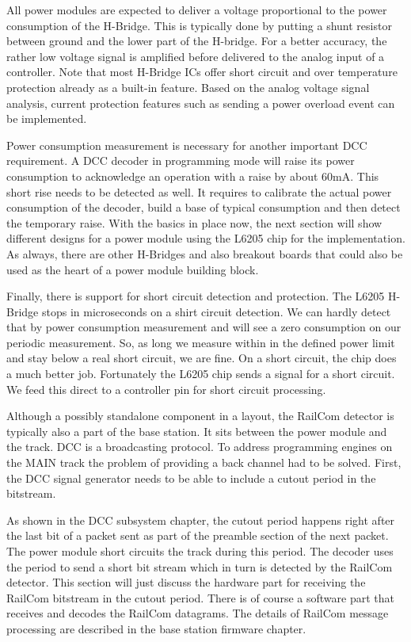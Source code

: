 All power modules are expected to deliver a voltage proportional to the power consumption of the H-Bridge. This is typically done by putting a shunt resistor between ground and the lower part of the H-bridge. For a better accuracy, the rather low voltage signal is amplified before delivered to the analog input of a controller. Note that most H-Bridge ICs offer short circuit and over temperature protection already as a built-in feature. Based on the analog voltage signal analysis, current protection features such as sending a power overload event can be implemented.

Power consumption measurement is necessary for another important DCC requirement. A DCC decoder in programming mode will raise its power consumption to acknowledge an operation with a raise by about 60mA. This short rise needs to be detected as well. It requires to calibrate the actual power consumption of the decoder, build a base of typical consumption and then detect the temporary raise. With the basics in place now, the next section will show different designs for a power module using the L6205 chip for the implementation. As always, there are other H-Bridges and also breakout boards that could also be used as the heart of a power module building block.

Finally, there is support for short circuit detection and protection. The L6205 H-Bridge stops in microseconds on a shirt circuit detection. We can hardly detect that by power consumption measurement and will see a zero consumption on our periodic measurement. So, as long we measure within in the defined power limit and stay below a real short circuit, we are fine. On a short circuit, the chip does a much better job. Fortunately the L6205 chip sends a signal for a short circuit. We feed this direct to a controller pin for short circuit processing.



Although a possibly standalone component in a layout, the RailCom detector is typically also a part of the base station. It sits between the power module and the track. DCC is a broadcasting protocol. To address programming engines on the MAIN track the problem of providing a back channel had to be solved. First, the DCC signal generator needs to be able to include a cutout period in the bitstream. 

As shown in the DCC subsystem chapter, the cutout period happens right after the last bit of a packet sent as part of the preamble section of the next packet. The power module short circuits the track during this period. The decoder uses the period to send a short bit stream which in turn is detected by the RailCom detector. This section will just discuss the hardware part for receiving the RailCom bitstream in the cutout period. There is of course a software part that receives and decodes the RailCom datagrams. The details of RailCom message processing are described in the base station firmware chapter.

